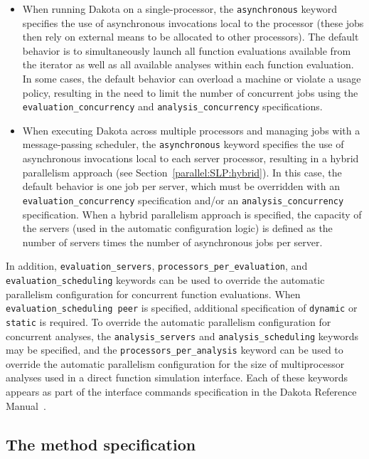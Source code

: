 \begin{itemize}
\item When running Dakota on a single-processor, the
  \texttt{asynchronous} keyword specifies the use of asynchronous
  invocations local to the processor (these jobs then rely on external
  means to be allocated to other processors). The default behavior is
  to simultaneously launch all function evaluations available from the
  iterator as well as all available analyses within each function
  evaluation. In some cases, the default behavior can overload a
  machine or violate a usage policy, resulting in the need to limit
  the number of concurrent jobs using the
  \texttt{evaluation\_concurrency} and \texttt{analysis\_concurrency}
  specifications.

\item When executing Dakota across multiple processors and managing
  jobs with a message-passing scheduler, the \texttt{asynchronous}
  keyword specifies the use of asynchronous invocations local to each
  server processor, resulting in a hybrid parallelism approach (see
  Section~\ref{parallel:SLP:hybrid}). In this case, the default
  behavior is one job per server, which must be overridden with an
  \texttt{evaluation\_concurrency} specification and/or an
  \texttt{analysis\_concurrency} specification. When a hybrid
  parallelism approach is specified, the capacity of the servers (used
  in the automatic configuration logic) is defined as the number of
  servers times the number of asynchronous jobs per server.
\end{itemize}

In addition, \texttt{evaluation\_servers},
\texttt{processors\_per\_evaluation}, and
\texttt{evaluation\_scheduling} keywords can be used to
override the automatic parallelism configuration for concurrent
function evaluations. When \texttt{evaluation\_scheduling peer} is
specified, additional specification of \texttt{dynamic} or
\texttt{static} is required. To override the automatic parallelism
configuration for concurrent analyses, the \texttt{analysis\_servers} 
and \texttt{analysis\_scheduling} keywords may be specified, and
the \texttt{processors\_per\_analysis} keyword can be used to override
the automatic parallelism configuration for the size of multiprocessor
analyses used in a direct function simulation interface. Each of these
keywords appears as part of the interface commands specification in
the Dakota Reference Manual~\cite{RefMan}.

\subsection{The method specification}\label{parallel:spec:method}

